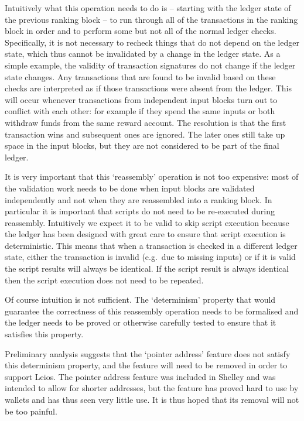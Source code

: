 \documentclass[11pt,a4paper]{article}
\begin{document}
Intuitively what this operation needs to do is -- starting with the ledger state
of the previous ranking block -- to run through all of the transactions in the
ranking block in order and to perform some but not all of the normal ledger
checks. Specifically, it is not necessary to recheck things that do not depend
on the ledger state, which thus cannot be invalidated by a change in the ledger
state. As a simple example, the validity of transaction signatures do not
change if the ledger state changes. Any transactions that are found to be
invalid based on these checks are interpreted as if those transactions were
absent from the ledger. This will occur whenever transactions from independent input blocks
turn out to conflict with each other: for example if they spend the same inputs
or both withdraw funds from the same reward account. The resolution is that the
first transaction wins and subsequent ones are ignored. The later ones still
take up space in the input blocks, but they are not considered to be part of
the final ledger.

It is very important that this `reassembly' operation is not too expensive:
most of the validation work needs to be done when input blocks are validated
independently and not when they are reassembled into a ranking block. In
particular it is important that scripts do not need to be re-executed during
reassembly. Intuitively we expect it to be valid to skip script execution
because the ledger has been designed with great care to ensure that script
execution is deterministic. This means that when a transaction is checked in a
different ledger state, either the transaction is invalid (e.g.~due to missing
inputs) or if it is valid the script results will always be identical. If the
script result is always identical then the script execution does not need to be
repeated.

Of course intuition is not sufficient. The `determinism' property that would
guarantee the correctness of this reassembly operation needs to be formalised
and the ledger needs to be proved or otherwise carefully tested to ensure that
it satisfies this property.

Preliminary analysis suggests that the `pointer address' feature does not
satisfy this determinism property, and the feature will need to be removed in
order to support Leios. The pointer address feature was included in Shelley and
was intended to allow for shorter addresses, but the feature has proved hard to
use by wallets and has thus seen very little use. It is thus hoped that its
removal will not be too painful.
\end{document}
